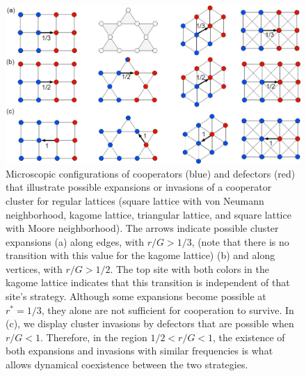 \documentclass[5p,review]{elsarticle}
\begin{document}
  \begin{figure}[!ht]
     \centering
     \includegraphics[width=\linewidth]{figs/apendice3.jpg}
     \caption{ Microscopic configurations of cooperators (blue) and defectors (red) that illustrate possible expansions or invasions of a cooperator cluster for regular lattices (square lattice with von Neumann neighborhood, kagome lattice, triangular lattice, and square lattice with Moore neighborhood). The arrows indicate possible cluster expansions (a)  along edges, with $r/G > 1/3$, (note that there is no transition with this value for the kagome lattice)  (b) and along vertices, with $r/G>1/2$. The top site with both colors in the kagome lattice indicates that this transition is independent of that site's strategy.  Although some expansions become possible at $r^*=1/3$, they alone are not sufficient for cooperation to survive. In (c), we display cluster invasions by defectors that are possible when  $r/G < 1$. Therefore, in the region $1/2< r/G < 1$,  the existence of both expansions and invasions with similar frequencies is what allows dynamical coexistence between the two strategies.
      }
     \label{retas}
\end{figure} 
\end{document}
